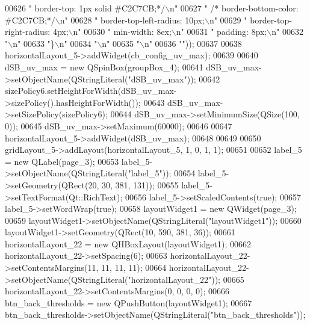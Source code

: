 \begin{DoxyCode}
00626 \textcolor{stringliteral}{" border-top: 1px solid #C2C7CB;*/\(\backslash\)n"}
00627 \textcolor{stringliteral}{"   /*  border-bottom-color: #C2C7CB;*/\(\backslash\)n"}
00628 \textcolor{stringliteral}{"     border-top-left-radius: 10px;\(\backslash\)n"}
00629 \textcolor{stringliteral}{"     border-top-right-radius: 4px;\(\backslash\)n"}
00630 \textcolor{stringliteral}{"     min-width: 8ex;\(\backslash\)n"}
00631 \textcolor{stringliteral}{"     padding: 8px;\(\backslash\)n"}
00632 \textcolor{stringliteral}{"\(\backslash\)n"}
00633 \textcolor{stringliteral}{"\}\(\backslash\)n"}
00634 \textcolor{stringliteral}{"\(\backslash\)n"}
00635 \textcolor{stringliteral}{"\(\backslash\)n"}
00636 \textcolor{stringliteral}{""}));
00637 
00638         horizontalLayout\_5->addWidget(cb\_config\_uv\_max);
00639 
00640         dSB\_uv\_max = \textcolor{keyword}{new} QSpinBox(groupBox\_4);
00641         dSB\_uv\_max->setObjectName(QStringLiteral(\textcolor{stringliteral}{"dSB\_uv\_max"}));
00642         sizePolicy6.setHeightForWidth(dSB\_uv\_max->sizePolicy().hasHeightForWidth());
00643         dSB\_uv\_max->setSizePolicy(sizePolicy6);
00644         dSB\_uv\_max->setMinimumSize(QSize(100, 0));
00645         dSB\_uv\_max->setMaximum(60000);
00646 
00647         horizontalLayout\_5->addWidget(dSB\_uv\_max);
00648 
00649 
00650         gridLayout\_5->addLayout(horizontalLayout\_5, 1, 0, 1, 1);
00651 
00652         label\_5 = \textcolor{keyword}{new} QLabel(page\_3);
00653         label\_5->setObjectName(QStringLiteral(\textcolor{stringliteral}{"label\_5"}));
00654         label\_5->setGeometry(QRect(20, 30, 381, 131));
00655         label\_5->setTextFormat(Qt::RichText);
00656         label\_5->setScaledContents(\textcolor{keyword}{true});
00657         label\_5->setWordWrap(\textcolor{keyword}{true});
00658         layoutWidget1 = \textcolor{keyword}{new} QWidget(page\_3);
00659         layoutWidget1->setObjectName(QStringLiteral(\textcolor{stringliteral}{"layoutWidget1"}));
00660         layoutWidget1->setGeometry(QRect(10, 590, 381, 36));
00661         horizontalLayout\_22 = \textcolor{keyword}{new} QHBoxLayout(layoutWidget1);
00662         horizontalLayout\_22->setSpacing(6);
00663         horizontalLayout\_22->setContentsMargins(11, 11, 11, 11);
00664         horizontalLayout\_22->setObjectName(QStringLiteral(\textcolor{stringliteral}{"horizontalLayout\_22"}));
00665         horizontalLayout\_22->setContentsMargins(0, 0, 0, 0);
00666         btn\_back\_thresholds = \textcolor{keyword}{new} QPushButton(layoutWidget1);
00667         btn\_back\_thresholds->setObjectName(QStringLiteral(\textcolor{stringliteral}{"btn\_back\_thresholds"}));

\end{DoxyCode}
